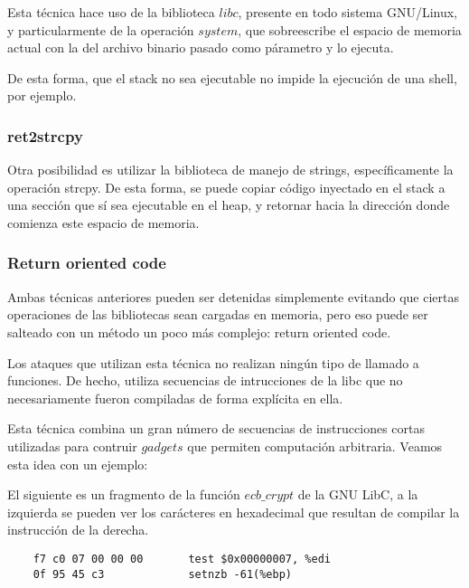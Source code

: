 	Esta t\'ecnica hace uso de la biblioteca $libc$, presente en todo sistema GNU/Linux, y particularmente de la operaci\'on $system$, que sobreescribe el espacio de memoria actual con la del archivo binario pasado como p\'arametro y lo ejecuta.
	
	De esta forma, que el stack no sea ejecutable no impide la ejecuci\'on de una shell, por ejemplo.
	
	\subsubsection{ret2strcpy}
		\label{sec:ret2strcpy}
	
	Otra posibilidad es utilizar la biblioteca de manejo de strings, espec\'ificamente la operaci\'on strcpy. De esta forma, se puede copiar c\'odigo inyectado en el stack a una secci\'on que s\'i sea ejecutable en el heap, y retornar hacia la direcci\'on donde comienza este espacio de memoria.
	
	\subsubsection{Return oriented code}
		\label{sec:ret2code}
	
	Ambas t\'ecnicas anteriores pueden ser detenidas simplemente evitando que ciertas operaciones de las bibliotecas sean cargadas en memoria, pero eso puede ser salteado con un m\'etodo un poco m\'as complejo: return oriented code.
	
	Los ataques que utilizan esta t\'ecnica no realizan ning\'un tipo de llamado a funciones. De hecho, utiliza secuencias de intrucciones de la libc que no necesariamente fueron compiladas de forma expl\'icita en ella.
	
	Esta t\'ecnica combina un gran n\'umero de secuencias de instrucciones cortas utilizadas para contruir $gadgets$ que permiten computaci\'on arbitraria. Veamos esta idea con un ejemplo:
	
	El siguiente es un fragmento de la funci\'on $ecb\_crypt$ de la GNU LibC, a la izquierda se pueden ver los car\'acteres en hexadecimal que resultan de compilar la instrucci\'on de la derecha.
	
	\vspace{5 mm}
	
	\begin{lstlisting}
	f7 c0 07 00 00 00		test $0x00000007, %edi
	0f 95 45 c3      		setnzb -61(%ebp)
	\end{lstlisting}
	
